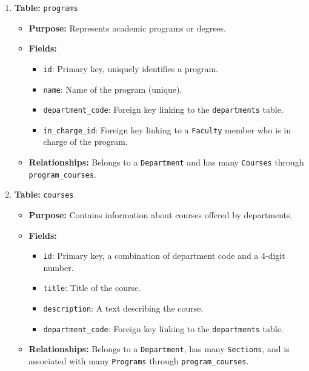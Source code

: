 \documentclass{article}
\begin{document}
\begin{enumerate}
		    \item \textbf{Table:} \texttt{programs}
		    \begin{itemize}
		        \item \textbf{Purpose:} Represents academic programs or degrees.
		        \item \textbf{Fields:}
		        \begin{itemize}
		            \item \texttt{id}: Primary key, uniquely identifies a program.
		            \item \texttt{name}: Name of the program (unique).
		            \item \texttt{department\_code}: Foreign key linking to the \texttt{departments} table.
		            \item \texttt{in\_charge\_id}: Foreign key linking to a \texttt{Faculty} member who is in charge of the program.
		        \end{itemize}
		        \item \textbf{Relationships:} Belongs to a \texttt{Department} and has many \texttt{Courses} through \texttt{program\_courses}.
		    \end{itemize}

		    \item \textbf{Table:} \texttt{courses}
		    \begin{itemize}
		        \item \textbf{Purpose:} Contains information about courses offered by departments.
		        \item \textbf{Fields:}
		        \begin{itemize}
		            \item \texttt{id}: Primary key, a combination of department code and a 4-digit number.
		            \item \texttt{title}: Title of the course.
		            \item \texttt{description}: A text describing the course.
		            \item \texttt{department\_code}: Foreign key linking to the \texttt{departments} table.
		        \end{itemize}
		        \item \textbf{Relationships:} Belongs to a \texttt{Department}, has many \texttt{Sections}, and is associated with many \texttt{Programs} through \texttt{program\_courses}.
		    \end{itemize}


\end{enumerate}
\end{document}
